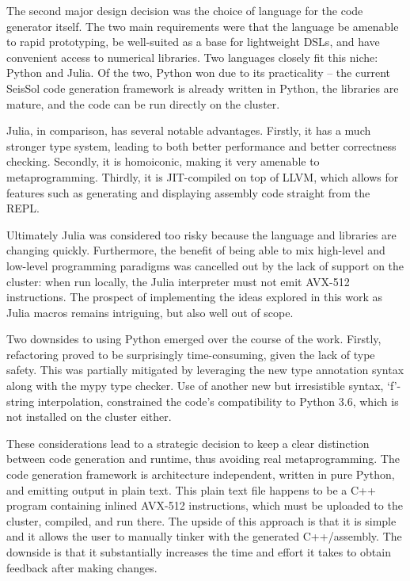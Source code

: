 The second major design decision was the choice of language for the code generator itself. The two main requirements were that the language be amenable to rapid prototyping, be well-suited as a base for lightweight \glspl{DSL}, and have convenient access to numerical libraries. Two languages closely fit this niche: Python and Julia. Of the two, Python won due to its practicality -- the current SeisSol code generation framework is already written in Python, the libraries are mature, and the code can be run directly on the cluster. 

Julia, in comparison, has several notable advantages. Firstly, it has a much stronger type system, leading to both better performance and better correctness checking. Secondly, it is homoiconic, making it very amenable to metaprogramming. Thirdly, it is JIT-compiled on top of LLVM, which allows for features such as generating and displaying assembly code straight from the REPL. 

Ultimately Julia was considered too risky because the language and libraries are changing quickly. Furthermore, the benefit of being able to mix high-level and low-level programming paradigms was cancelled out by the lack of support on the cluster: when run locally, the Julia interpreter must not emit AVX-512 instructions. The prospect of implementing the ideas explored in this work as Julia macros remains intriguing, but also well out of scope.

Two downsides to using Python emerged over the course of the work. Firstly, refactoring proved to be surprisingly time-consuming, given the lack of type safety. This was partially mitigated by leveraging the new type annotation syntax along with the mypy type checker. Use of another new but irresistible syntax, `f'-string interpolation, constrained the code's compatibility to Python 3.6, which is not installed on the cluster either.

These considerations lead to a strategic decision to keep a clear distinction between code generation and runtime, thus avoiding real metaprogramming. The code generation framework is architecture independent, written in pure Python, and emitting output in plain text. This plain text file happens to be a C++ program containing inlined AVX-512 instructions, which must be uploaded to the cluster, compiled, and run there. The upside of this approach is that it is simple and it allows the user to manually tinker with the generated C++/assembly. The downside is that it substantially increases the time and effort it takes to obtain feedback after making changes. 




